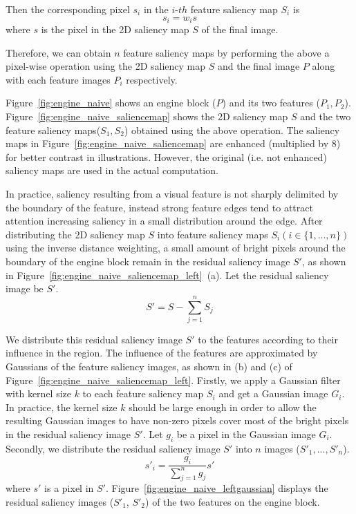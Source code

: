 Then the corresponding pixel $ s_{i} $ in the $i$-$th$  feature saliency map $ S_{i} $ is
\[ s_{i}=w_{i}s \]
where $ s $ is the pixel in the 2D saliency map $ S $ of the final image.

Therefore, we can obtain $ n $ feature saliency maps by performing the above a pixel-wise operation using the 2D saliency map $ S $ and the final image $ P $ along with each feature images $ P_{i} $ respectively.

Figure~\ref{fig:engine_naive} shows an engine block ($ P $) and its two features ($ P_{1} , P_{2} $).
Figure~\ref{fig:engine_naive_saliencemap} shows the 2D saliency map $ S $ and the two feature saliency maps($ S_{1} , S_{2} $) obtained using the above operation.
The saliency maps in Figure~\ref{fig:engine_naive_saliencemap} are enhanced (multiplied by 8) for better contrast in illustrations. However, the original (i.e. not enhanced) saliency maps are used in the actual computation.

In practice, saliency resulting from a visual feature is not sharply delimited by the boundary of the feature, instead strong feature edges tend to attract attention increasing saliency in a small distribution around the edge.
After distributing the 2D saliency map $ S $ into feature saliency maps $ S_{i} (i \in \{1, ... ,n\})$ using the inverse distance weighting, a small amount of bright pixels around the boundary of the engine block remain in the residual saliency image $ S' $, as shown in Figure~\ref{fig:engine_naive_saliencemap_left}~(a).
Let the residual saliency image be $ S' $.
\[ S'=S- \sum_{j=1}^{n} S_{j} \]

We distribute this residual saliency image $ S' $ to the features according to their influence in the region. The influence of the features are approximated by Gaussians of the feature saliency images, as shown in (b) and (c) of Figure~\ref{fig:engine_naive_saliencemap_left}.
Firstly, we apply a Gaussian filter with kernel size $ k $ to each feature saliency map $ S_{i} $ and get a Gaussian image $ G_{i} $.
In practice, the kernel size $ k $ should be large enough in order to allow the resulting Gaussian images to have non-zero pixels cover most of the bright pixels in the residual saliency image $ S' $.
Let $ g_{i} $ be a pixel in the Gaussian image $ G_{i} $.
Secondly, we distribute the residual saliency image $ S' $ into $ n $ images ($ S'_{1} , ... , S'_{n} $).
\[ s'_{i} = \frac{ g_{i} }{ \sum_{j=1}^{n} g_{j} }s' \]
where $ s' $ is a pixel in $ S' $.
Figure~\ref{fig:engine_naive_leftgaussian} displays the residual saliency images ($ S'_{1} $, $ S'_{2} $) of the two features on the engine block. 

